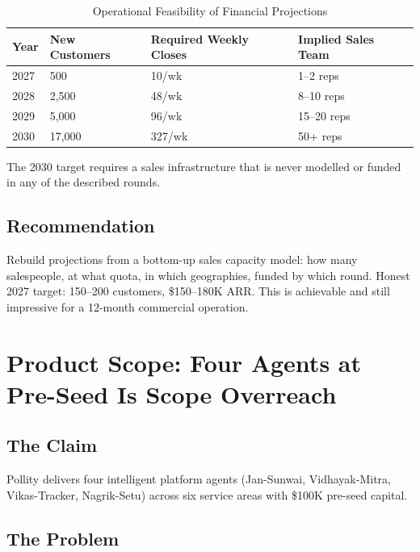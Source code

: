 \documentclass[12pt, a4paper]{article}
\begin{document}
\begin{table}[h!]
\centering
\caption{Operational Feasibility of Financial Projections}
\renewcommand{\arraystretch}{1.3}
\begin{tabularx}{\textwidth}{lXXX}
\toprule
\rowcolor{rowblue}
\textbf{Year} & \textbf{New Customers} & \textbf{Required Weekly Closes} & \textbf{Implied Sales Team} \\
\midrule
2027 & 500  & 10/wk & 1--2 reps \\
2028 & 2,500 & 48/wk & 8--10 reps \\
2029 & 5,000 & 96/wk & 15--20 reps \\
2030 & 17,000 & 327/wk & 50+ reps \\
\bottomrule
\end{tabularx}
\end{table}

The 2030 target requires a sales infrastructure that is never modelled or funded in any of the described rounds.

\subsection{Recommendation}
Rebuild projections from a bottom-up sales capacity model: how many salespeople, at what quota, in which geographies, funded by which round. Honest 2027 target: 150--200 customers, \$150--180K ARR. This is achievable and still impressive for a 12-month commercial operation.

\newpage

\section{Product Scope: Four Agents at Pre-Seed Is Scope Overreach}

\subsection{The Claim}
Pollity delivers four intelligent platform agents (Jan-Sunwai, Vidhayak-Mitra, Vikas-Tracker, Nagrik-Setu) across six service areas with \$100K pre-seed capital.

\subsection{The Problem}
\end{document}
